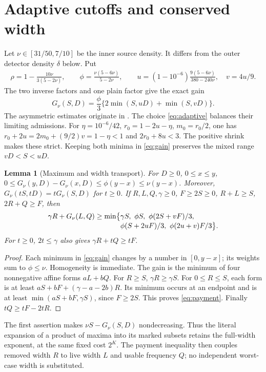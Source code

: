 \documentclass[10pt,a4paper]{article}
\newcommand{\gain}{G_\nu}
\newtheorem{lemma}{Lemma}
\begin{document}
\newpage
\section{Adaptive cutoffs and conserved width}
Let $\nu\in[31/50,7/10]$ be the inner source density. It differs from
the outer detector density $\delta$ below. Put
\begin{gather}\label{eq:adaptive}
 \rho=1-\frac{10\nu}{3(5-2\nu)},\qquad
 \phi=\frac{\nu(5-6\nu)}{5-2\nu},\qquad
 u=(1-10^{-6})\frac{9(5-6\nu)}{380-240\nu},\quad v=4u/9.
\end{gather}
The two inverse factors and one plain factor give the exact gain
\begin{equation}\label{eq:gain}
 \gain(S,D)=\frac\phi3\{2\min(S,uD)+\min(S,vD)\}.
\end{equation}
The asymmetric estimates originate in \cite{asymmetric}.
The choice \eqref{eq:adaptive} balances their limiting admissions.
For $\eta=10^{-6}/42$, $r_0=1-2u-\eta$, $m_0=r_0/2$, one has
$r_0+2u=2m_0+(9/2)v=1-\eta<1$ and $2r_0+8u<3$.
The positive shrink makes these strict. Keeping both minima in
\eqref{eq:gain} preserves the mixed range $vD<S<uD$.

\begin{lemma}[Maximum and width transport]\label{lem:transport}
For $D\ge0$, $0\le x\le y$,
$0\le\gain(y,D)-\gain(x,D)\le\phi(y-x)\le\nu(y-x)$.
Moreover, $\gain(tS,tD)=t\gain(S,D)$ for $t\ge0$.
If $R,L,Q,\gamma\ge0$, $F\ge2S\ge0$, $R+L\ge S$, $2R+Q\ge F$, then
\begin{align}\label{eq:payment}
 \gamma R+\gain(L,Q)\ge\min\bigl\{&\gamma S,\ \phi S,
 \ \phi(2S+vF)/3,\notag\\[-1mm]
 &\phi(S+2uF)/3,\ \phi(2u+v)F/3\bigr\}.
\end{align}
For $t\ge0$, $2t\le\gamma$ also gives $\gamma R+tQ\ge tF$.
\end{lemma}
\begin{proof}
Each minimum in \eqref{eq:gain} changes by a number in $[0,y-x]$;
its weights sum to $\phi\le\nu$. Homogeneity is immediate.
The gain is the minimum of four nonnegative affine forms $aL+bQ$.
For $R\ge S$, $\gamma R\ge\gamma S$. For $0\le R\le S$, each
form is at least $aS+bF+(\gamma-a-2b)R$. Its minimum occurs at an
endpoint and is at least $\min(aS+bF,\gamma S)$, since $F\ge2S$.
This proves \eqref{eq:payment}. Finally $tQ\ge tF-2tR$.
\end{proof}
The first assertion makes $\nu S-\gain(S,D)$ nondecreasing.
Thus the literal expansion of a product of maxima into its marked
subsets retains the full-width exponent, at the same fixed cost $2^K$.
The payment inequality then couples removed width $R$ to live width $L$
and usable frequency $Q$; no independent worst-case width is substituted.
\end{document}
